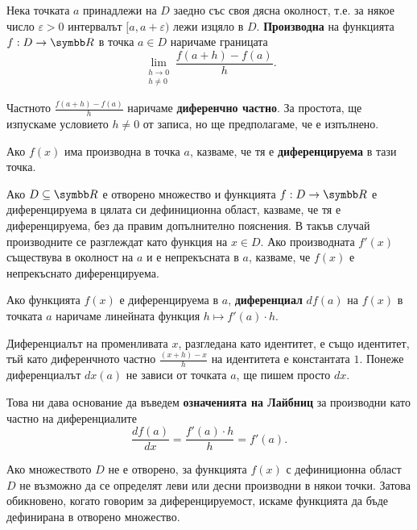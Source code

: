 \documentclass[numbers=endperiod, bibliography=totocnumbered]{scrartcl}
\begin{document}
\begin{definition}
  Нека точката \( a \) принадлежи на \( D \) заедно със своя дясна околност, т.е. за някое число \( \varepsilon > 0 \) интервалът \( [a, a + \varepsilon) \) лежи изцяло в \( D \). \textbf{Производна} на функцията \( f: D \to \R \) в точка \( a \in D \) наричаме границата
  \begin{equation*}
    \lim_{\substack{h \to 0 \\ h \neq 0}} \frac {f(a + h) - f(a)} h.
  \end{equation*}

  Частното \( \frac {f(a + h) - f(a)} h \) наричаме \textbf{диференчно частно}. За простота, ще изпускаме условието \( h \neq 0 \) от записа, но ще предполагаме, че е изпълнено.

  Ако \( f(x) \) има производна в точка \( a \), казваме, че тя е \textbf{диференцируема} в тази точка.

  Ако \( D \subseteq \R \) е отворено множество и функцията \( f: D \to \R \) е диференцируема в цялата си дефиниционна област, казваме, че тя е диференцируема, без да правим допълнително пояснения. В такъв случай производните се разглеждат като функция на \( x \in D \). Ако производната \( f'(x) \) съществува в околност на \( a \) и е непрекъсната в \( a \), казваме, че \( f(x) \) е непрекъснато диференцируема.

  Ако функцията \( f(x) \) е диференцируема в \( a \), \textbf{диференциал} \( df(a) \) на \( f(x) \) в точката \( a \) наричаме линейната функция \( h \mapsto f'(a) \cdot h \).

  Диференциалът на променливата \( x \), разгледана като идентитет, е също идентитет, тъй като диференчното частно \( \frac {(x + h) - x} h \) на идентитета е константата \( 1 \). Понеже диференциалът \( dx(a) \) не зависи от точката \( a \), ще пишем просто \( dx \).

  Това ни дава основание да въведем \textbf{означенията на Лайбниц} за производни като частно на диференциалите
  \begin{equation*}
    \frac {df(a)} {dx} = \frac {f'(a) \cdot h} h = f'(a).
  \end{equation*}
\end{definition}

\begin{remark}
  Ако множеството \( D \) не е отворено, за функцията \( f(x) \) с дефиниционна област \( D \) не възможно да се определят леви или десни производни в някои точки. Затова обикновено, когато говорим за диференцируемост, искаме функцията да бъде дефинирана в отворено множество.
\end{remark}
\end{document}

